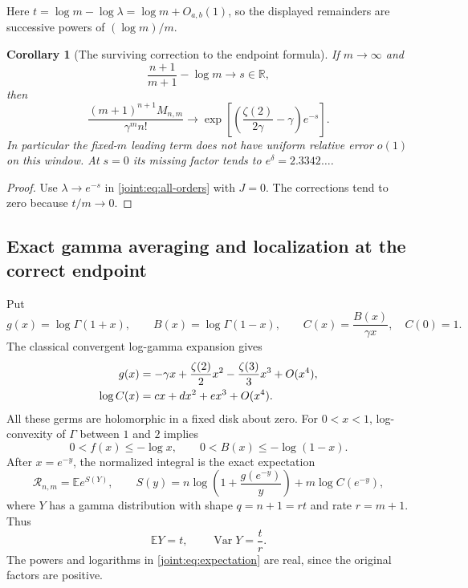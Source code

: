 \documentclass[11pt,a4paper]{article}
\numberwithin{equation}{section}
\theoremstyle{plain}
\newtheorem{corollary}[theorem]{Corollary}
\theoremstyle{definition}
\theoremstyle{remark}
\begin{document}
Here $t=\log m-\log\lambda=\log m+O_{a,b}(1)$, so the displayed
remainders are successive powers of $(\log m)/m$.

\begin{corollary}[The surviving correction to the endpoint formula]
\label{joint:cor:limit}
If $m\to\infty$ and
\[
 \frac{n+1}{m+1}-\log m\longrightarrow s\in\mathbb R,
\]
then
\begin{equation}\label{joint:eq:limit}
 \frac{(m+1)^{n+1}M_{n,m}}{\gamma^m n!}
 \longrightarrow
 \exp\left[\left(\frac{\zeta(2)}{2\gamma}-\gamma\right)e^{-s}\right].
\end{equation}
In particular the fixed-$m$ leading term does not have uniform relative
error $o(1)$ on this window. At $s=0$ its missing factor tends to
$e^\delta=2.3342\ldots$.
\end{corollary}
\begin{proof}
Use $\lambda\to e^{-s}$ in \eqref{joint:eq:all-orders} with $J=0$.
The corrections tend to zero because $t/m\to0$.
\end{proof}

\subsection{Exact gamma averaging and localization at the correct endpoint}

Put
\[
 g(x)=\log\Gamma(1+x),\qquad
 B(x)=\log\Gamma(1-x),\qquad
 C(x)=\frac{B(x)}{\gamma x},\quad C(0)=1.
\]
The classical convergent log-gamma expansion
\cite[\S5.7]{joint:DLMF} gives
\begin{align}
 g(x)&=-\gamma x+\frac{\zeta(2)}2x^2
                         -\frac{\zeta(3)}3x^3+O(x^4),\notag\\
 \log C(x)&=cx+dx^2+ex^3+O(x^4).
 \label{joint:eq:local-series}
\end{align}
All these germs are holomorphic in a fixed disk about zero.
For $0<x<1$, log-convexity of $\Gamma$ between $1$ and $2$ implies
\begin{equation}\label{joint:eq:elementary-envelopes}
 0<f(x)\leq-\log x,\qquad
 0<B(x)\leq-\log(1-x).
\end{equation}
After $x=e^{-y}$, the normalized integral is the exact expectation
\begin{equation}\label{joint:eq:expectation}
 \mathcal R_{n,m}=\mathbb E e^{S(Y)},\qquad
 S(y)=n\log\left(1+\frac{g(e^{-y})}{y}\right)
                         +m\log C(e^{-y}),
\end{equation}
where $Y$ has a gamma distribution with shape $q=n+1=rt$ and rate
$r=m+1$. Thus
\[
 \mathbb EY=t,\qquad
 \operatorname{Var}Y=\frac tr.
\]
The powers and logarithms in \eqref{joint:eq:expectation} are real,
since the original factors are positive.
\end{document}

